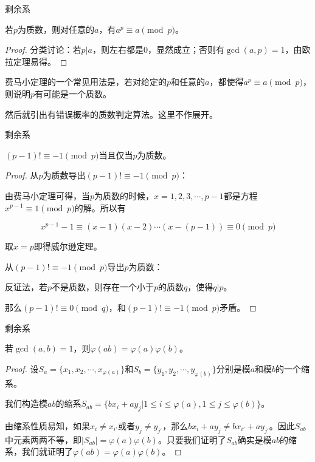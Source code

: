 \documentclass{ctexbeamer}        %
\begin{document}
\begin{frame}{剩余系}

\begin{theorem}[费马小定理]
    若$p$为质数，则对任意的$a$，有$a^p\equiv a \pmod p$。
\end{theorem}
\pause
\begin{proof}
	分类讨论：若$p|a$，则左右都是$0$，显然成立；否则有$\gcd(a,p)=1$，由欧拉定理易得。
\end{proof}

费马小定理的一个常见用法是，若对给定的$p$和任意的$a$，都使得$a^p\equiv a \pmod p$，则说明$p$有可能是一个质数。

然后就引出有错误概率的质数判定算法。这里不作展开。

\end{frame}

\begin{frame}{剩余系}

\begin{theorem}[威尔逊定理]
    $(p-1)!\equiv -1 \pmod p$当且仅当$p$为质数。
\end{theorem}
\pause
\begin{proof}
	从$p$为质数导出$(p-1)! \equiv -1 \pmod p$：
	
	由费马小定理可得，当$p$为质数的时候，$x=1,2,3,\cdots,p-1$都是方程$x^{p-1}\equiv 1 \pmod p$的解。所以有

	$$x^{p-1}-1 \equiv (x-1)(x-2)\cdots (x-(p-1)) \equiv 0 \pmod p$$

	取$x=p$即得威尔逊定理。

	从$(p-1)!\equiv -1 \pmod p$导出$p$为质数：

	反证法，若$p$不是质数，则存在一个小于$p$的质数$q$，使得$q|p$。

	那么$(p-1)! \equiv 0 \pmod q$，和$(p-1)! \equiv -1 \pmod p$矛盾。
\end{proof}

\end{frame}

\begin{frame}{剩余系}

\begin{theorem}[欧拉函数的积性]
    若$\gcd(a,b)=1$，则$\varphi(ab)=\varphi(a)\varphi(b)$。
\end{theorem}

\begin{proof}
	设$S_a=\lbrace x_1,x_2,\cdots,x_{\varphi(a)} \rbrace$和$S_b=\lbrace y_1,y_2,\cdots,y_{\varphi(b)} \rbrace$分别是模$a$和模$b$的一个缩系。

	我们构造模$ab$的缩系$S_{ab}=\lbrace bx_i+ay_j|1\le i\le \varphi(a),1\le j\le \varphi(b) \rbrace$。

	由缩系性质易知，如果$x_i \neq x_{i'}$或者$y_j \neq y_{j'}$，那么$bx_i+ay_j \neq bx_{i'}+ay_{j'}$。因此$S_{ab}$中元素两两不等，即$|S_{ab}|=\varphi(a)\varphi(b)$。只要我们证明了$S_{ab}$确实是模$ab$的缩系，我们就证明了$\varphi(ab)=\varphi(a)\varphi(b)$。
\end{proof}

\end{frame}
\end{document}
